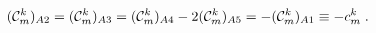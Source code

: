 \begin{equation}\label{colrel}
  ({\cal C}^k_m)_{A2} = ({\cal C}^k_m)_{A3} = ({\cal C}^k_m)_{A4} -2 ({\cal C}^k_m)_{A5} = -({\cal C}^k_m)_{A1} \equiv -c^k_m\;.
\end{equation}

